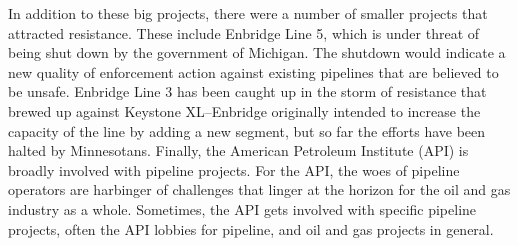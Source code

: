 In addition to these big projects, there were a number of smaller projects that attracted resistance. These include Enbridge Line 5, which is under threat of being shut down by the government of Michigan. The shutdown would indicate a new quality of enforcement action against existing pipelines that are believed to be unsafe. Enbridge Line 3 has been caught up in the storm of resistance that brewed up against Keystone XL--Enbridge originally intended to increase the capacity of the line by adding a new segment, but so far the efforts have been halted by Minnesotans. Finally, the American Petroleum Institute (API) is broadly involved with pipeline projects. For the API, the woes of pipeline operators are harbinger of challenges that linger at the horizon for the oil and gas industry as a whole. Sometimes, the API gets involved with specific pipeline projects, often the API lobbies for pipeline, and oil and gas projects in general.